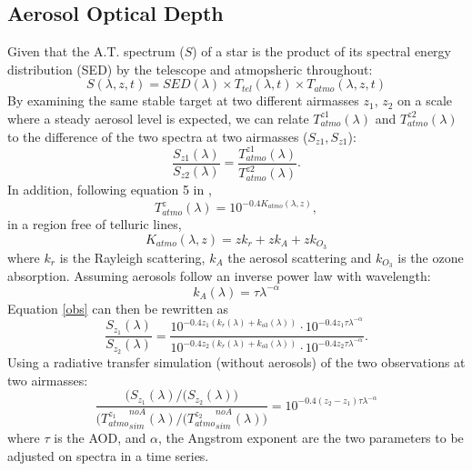 \documentclass[onecolumn]{aa}
\begin{document}
\subsection{Aerosol Optical Depth}


Given that the A.T. spectrum ($S$) of a star is the product of its spectral energy distribution (SED) by the telescope and atmopsheric throughout:
\begin{equation}
  S(\lambda, z, t) = SED(\lambda) \times T_{tel}(\lambda, t) \times T_{atmo}(\lambda, z, t) 
\end{equation}
By examining the same stable target at two different airmasses $z_1$, $z_2$ on a scale where a steady aerosol level is expected, we can relate $T_{atmo}^{z1}(\lambda)$ and $T_{atmo}^{z2}(\lambda)$ to the difference of the two spectra at two airmasses ($S_{z1}, S_{z1}$):
\begin{equation}
  \frac{S_{z1}(\lambda)}{S_{z2}(\lambda)}  =\frac{T_{atmo}^{z1}(\lambda)}{T_{atmo}^{z2}(\lambda)}.
  \label{obs}
\end{equation}
In addition, following equation 5 in \cite{buton},
\begin{equation}
T_{atmo}^{z}(\lambda) = 10^{-0.4 K_{atmo}(\lambda, z)},
\end{equation}
in a region free of telluric lines,
\begin{equation}
K_{atmo}(\lambda, z) = z k_r + z k_A + z k_{O_3}
\end{equation}
where $k_r$ is the Rayleigh scattering, $k_A$ the aerosol scattering and $k_{O_3}$ is the ozone absorption. Assuming aerosols follow an inverse power law with wavelength:
\begin{equation}
k_{A}(\lambda) = \tau \lambda^{-\alpha}
\end{equation}
Equation \ref{obs} can then be rewritten as
\begin{equation}
  \frac{S_{z_1}(\lambda)}{S_{z_2}(\lambda)}  =\frac{10^{-0.4 z_1 (k_r(\lambda) + k_{o3}(\lambda))} \cdot 10^{-0.4 z_1 \tau \lambda^{-\alpha}} }{10^{-0.4 z_2 (k_r(\lambda) + k_{o3}(\lambda))} \cdot 10^{-0.4 z_2 \tau \lambda^{-\alpha}}}.  
\end{equation}
Using a radiative transfer simulation (without aerosols) of the two observations at two airmasses:
\begin{equation}
  \frac{\Big(S_{z_1}(\lambda)/(S_{z_2}(\lambda)\Big)}{\Big({T_{atmo}^{z_1}}_{sim}^{noA}(\lambda)/({T_{atmo}^{z_2}}_{sim}^{noA}(\lambda)\Big)}  = 10^{-0.4 (z_2 - z_1)\tau \lambda^{-\alpha}}
\end{equation}
where $\tau$ is the AOD, and $\alpha$, the Angstrom exponent are the two parameters to be adjusted on spectra in a time series. 
\end{document}
